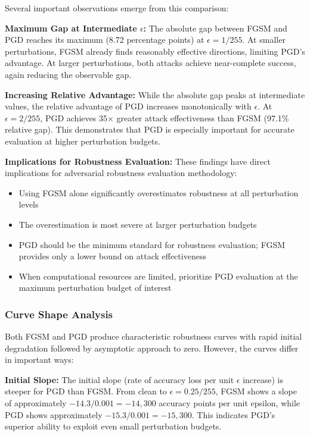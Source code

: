 \documentclass[12pt,a4paper]{article}
\begin{document}
Several important observations emerge from this comparison:

\textbf{Maximum Gap at Intermediate $\epsilon$:} The absolute gap between FGSM and PGD reaches its maximum (8.72 percentage points) at $\epsilon=1/255$. At smaller perturbations, FGSM already finds reasonably effective directions, limiting PGD's advantage. At larger perturbations, both attacks achieve near-complete success, again reducing the observable gap.

\textbf{Increasing Relative Advantage:} While the absolute gap peaks at intermediate values, the relative advantage of PGD increases monotonically with $\epsilon$. At $\epsilon=2/255$, PGD achieves 35$\times$ greater attack effectiveness than FGSM (97.1\% relative gap). This demonstrates that PGD is especially important for accurate evaluation at higher perturbation budgets.

\textbf{Implications for Robustness Evaluation:} These findings have direct implications for adversarial robustness evaluation methodology:
\begin{itemize}[leftmargin=*]
    \item Using FGSM alone significantly overestimates robustness at all perturbation levels
    \item The overestimation is most severe at larger perturbation budgets
    \item PGD should be the minimum standard for robustness evaluation; FGSM provides only a lower bound on attack effectiveness
    \item When computational resources are limited, prioritize PGD evaluation at the maximum perturbation budget of interest
\end{itemize}

\subsubsection{Curve Shape Analysis}

Both FGSM and PGD produce characteristic robustness curves with rapid initial degradation followed by asymptotic approach to zero. However, the curves differ in important ways:

\textbf{Initial Slope:} The initial slope (rate of accuracy loss per unit $\epsilon$ increase) is steeper for PGD than FGSM. From clean to $\epsilon=0.25/255$, FGSM shows a slope of approximately $-14.3/0.001 = -14,300$ accuracy points per unit epsilon, while PGD shows approximately $-15.3/0.001 = -15,300$. This indicates PGD's superior ability to exploit even small perturbation budgets.
\end{document}
